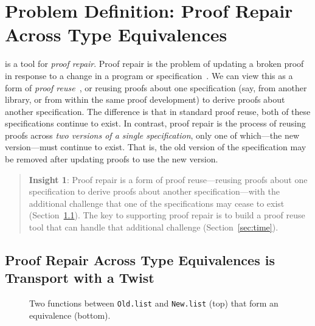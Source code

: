 \section{Problem Definition: Proof Repair Across Type Equivalences}
\label{sec:key1}

\toolname is a tool for \textit{proof repair}.
Proof repair is the problem of updating a broken proof in response to a change in a program or specification~\cite{PGL-045, pumpkinpatch}.
We can view this as a form of 
\textit{proof reuse}~\cite{Ringer2019, felty1994generalization, caplan1995logical, pons2000generalization, johnsen2004theorem}, %
or reusing proofs about one specification (say, from another library, or from within the same proof development)
to derive proofs about another specification.
The difference is that in standard proof reuse, both of these specifications continue to exist.
In contrast, proof repair is the process of reusing proofs across \textit{two versions of a single specification},
only one of which---the new version---must continue to exist.
That is, the old version of the specification may be removed after updating proofs to use the new version.

\begin{quote}
\textbf{Insight 1}:
Proof repair is a form of proof reuse---reusing proofs about one specification to derive proofs about another specification---with 
the additional challenge that one of the specifications may cease to exist (Section~\ref{sec:repair}).
The key to supporting proof repair is to build a proof reuse
tool that can handle that additional challenge (Section~\ref{sec:time}).
\end{quote}

\subsection{Proof Repair Across Type Equivalences is Transport with a Twist}
\label{sec:repair}

\begin{figure}
\vspace{-0.3cm}
\caption{Two functions between \lstinline{Old.list} and \lstinline{New.list} (top) that form an equivalence (bottom).}
\label{fig:equivalence}
\end{figure}

